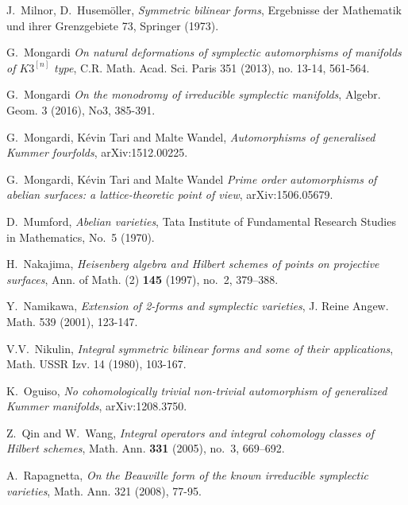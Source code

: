 \begin{thebibliography}{10}
J.~Milnor, D.~Husem\"oller, \emph{Symmetric bilinear forms}, Ergebnisse der Mathematik
  und ihrer Grenzgebiete 73, Springer (1973).


G.~Mongardi
\emph{On natural deformations of symplectic automorphisms of manifolds of $K3^{[n]}$ type},
C.R. Math. Acad. Sci. Paris  
351 (2013), no. 13-14, 561-564.

G.~Mongardi
\emph{On the monodromy of irreducible symplectic manifolds},
Algebr. Geom. 
3 (2016), No3, 385-391.

G.~Mongardi, K\'evin Tari and Malte Wandel,
\emph{Automorphisms of generalised Kummer fourfolds},
arXiv:1512.00225. 

G.~Mongardi, K\'evin Tari and Malte Wandel
\emph{Prime order automorphisms of abelian surfaces: a lattice-theoretic point of view},
arXiv:1506.05679. 

D.~Mumford, \emph{Abelian varieties}, Tata Institute of Fundamental Research Studies in Mathematics, 
  No.~5 (1970).

H.~Nakajima, \emph{Heisenberg algebra and Hilbert schemes of points on
  projective surfaces}, Ann. of Math. (2) \textbf{145} (1997), no.~2, 379--388.

Y.~Namikawa,
\emph{Extension of 2-forms and symplectic varieties},
J. Reine Angew. Math. 
539 (2001), 123-147.

V.V.~Nikulin,
\emph{Integral symmetric bilinear forms and some of their applications},
Math. USSR Izv.
14 (1980), 103-167.

K.~Oguiso,
\emph{No cohomologically trivial non-trivial automorphism of generalized Kummer manifolds},
arXiv:1208.3750.

Z.~Qin and W.~Wang, \emph{Integral operators and integral cohomology classes of
  {H}ilbert schemes}, Math. Ann. \textbf{331} (2005), no.~3, 669--692.

A.~Rapagnetta,
\emph{On the Beauville form of the known irreducible symplectic varieties},
Math. Ann.
321 (2008), 77-95.



\end{thebibliography}
